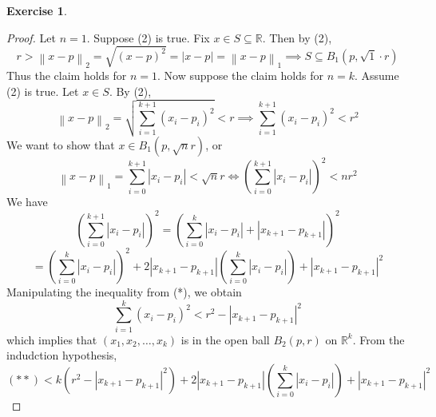 \documentclass{article}
\theoremstyle{plain} %
\numberwithin{thm}{section} %
\theoremstyle{definition}
\newtheorem{exercise}[thm]{Exercise} %
\begin{document}
\begin{exercise}
\begin{proof}
            Let \(n = 1\). Suppose (2) is true. Fix \(x \in S \subseteq \mathbb{R} \). Then by (2),
            \[
                r > \left\lVert x - p \right\rVert _2 = \sqrt{(x - p)^2} = \left\vert x - p \right\vert = \left\lVert x - p \right\rVert _1 \implies S \subseteq B_1(p, \sqrt{1} \cdot r) 
            \]
            Thus the claim holds for \(n = 1\). Now suppose the claim holds for \(n = k\). Assume (2) is true. Let \(x \in S\). By (2),
            \[
                \left\lVert x - p \right\rVert _2 = \sqrt{\sum_{i=1}^{k+1} (x_i - p_i)^2} < r \implies \sum_{i=1}^{k+1} (x_i - p_i)^2 < r^2\tag{*}
            \]
            We want to show that \(x \in B_1(p, \sqrt{n} r)\), or
            \[
                \left\lVert x - p \right\rVert _1 = \sum_{i=0}^{k+1} \left\vert x_i - p_i \right\vert < \sqrt{n} r \iff \left(\sum_{i=0}^{k+1} \left\vert x_i - p_i \right\vert\right)^2 < nr^2 
            \]
            We have
            \[
                \left(\sum_{i=0}^{k+1} \left\vert x_i - p_i \right\vert\right)^2 = \left(\sum_{i=0}^{k} \left\vert x_i - p_i \right\vert + \left\vert x_{k+1} - p_{k+1} \right\vert \right)^2
            \]
            \[
                = \left(\sum_{i=0}^{k} \left\vert x_i - p_i \right\vert\right)^2 + 2\left\vert x_{k+1} - p_{k+1} \right\vert \left(\sum_{i=0}^{k} \left\vert x_i - p_i \right\vert\right) + \left\vert x_{k+1} - p_{k+1} \right\vert ^2 \tag{**}
            \]
            Manipulating the inequality from (*), we obtain
            \[
                \sum_{i=1}^{k} (x_i - p_i)^2 < r^2 - \left\vert x_{k+1} - p_{k+1}  \right\vert ^2
            \]
            which implies that \((x_1, x_2, \dots , x_k)\) is in the open ball \(B_2(p, r)\) on \(\mathbb{R} ^k\). From the indudction hypothesis,
            \[
                (**) < k(r^2 - \left\vert x_{k+1} - p_{k+1}  \right\vert ^2) + 2\left\vert x_{k+1} - p_{k+1} \right\vert \left(\sum_{i=0}^{k} \left\vert x_i - p_i \right\vert\right) + \left\vert x_{k+1} - p_{k+1} \right\vert ^2
            \]

        \end{proof}
    \end{exercise}
\end{document}
